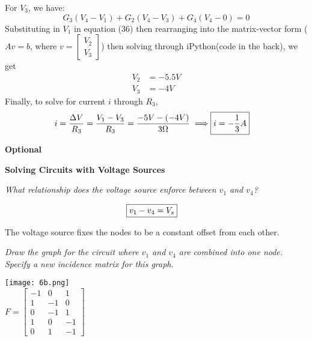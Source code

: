 \documentclass[letter]{article}
\newenvironment{menumerate}{%
  \edef\backupindent{\the\parindent}%
  \enumerate%
  \setlength{\parindent}{\backupindent}%
}{\endenumerate}
\begin{document}
\begin{menumerate}
    For $V_3$, we have:
    \begin{equation}
        G_3(V_4 - V_1) + G_2(V_4 - V_3) + G_4(V_4 - 0) = 0
    \end{equation}
    Substituting in $V_1$ in equation (36) then rearranging into the matrix-vector form ($Av = b$, where $v =
    \begin{bmatrix}
        V_2\\ V_3
    \end{bmatrix}$) then solving through iPython(code in the back), we get
    \begin{align}
        V_2 &= -5.5V \\
        V_3 &= -4V
    \end{align}
    Finally, to solve for current $i$ through $R_3$,
    \begin{align}
        i = \frac{\Delta V}{R_3} = \frac{V_1 - V_3}{R_3} = \frac{-5V - (-4V)}{3\Omega} \implies \Aboxed{i = -\frac{1}{3}A}
    \end{align}

    \item \textbf{Optional}

    \item \textbf{Solving Circuits with Voltage Sources}
    \begin{menumerate}
        \item \emph{What relationship does the voltage source enforce between $v_1$ and $v_4$?}

        \begin{align}
            \Aboxed{v_1 - v_4 = V_s}
        \end{align}

        The voltage source fixes the nodes to be a constant offset from each other.
        \item \emph{Draw the graph for the circuit where $v_1$ and $v_4$ are combined into one node. Specify a new incidence matrix for this graph.}

        \begin{center}
        \texttt{[image: 6b.png]} \\
        $F = \begin{bmatrix} -1&0&1\\1&-1&0\\0&-1&1\\1&0&-1\\0&1&-1\end{bmatrix}$
        \end{center}


\end{menumerate}
\end{menumerate}
\end{document}
